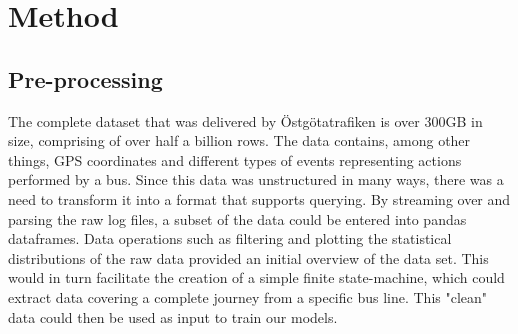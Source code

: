 
\chapter{Method}
\label{cha:method}

\section{Pre-processing}\label{pre-processing}
\label{sec:pre-processing}
The complete dataset that was delivered by Östgötatrafiken is over 300GB in size, comprising of over half a billion rows. The data contains, among other things, GPS coordinates and different types of events representing actions performed by a bus. Since this data was unstructured in many ways, there was a need to transform it into a format that supports querying. By streaming over and parsing the raw log files, a subset of the data could be entered into pandas dataframes. Data operations such as filtering and plotting the statistical distributions of the raw data provided an initial overview of the data set. This would in turn facilitate the creation of a simple finite state-machine, which could extract data covering a complete journey from a specific bus line. This "clean" data could then be used as input to train our models.

